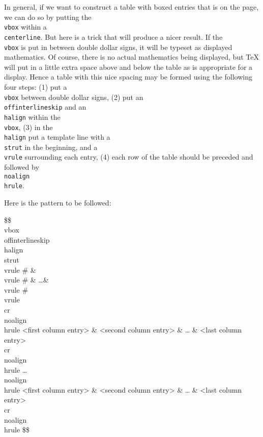 In general, if we want to construct a table with boxed entries 
that is \centred{} on the page, we can do so by putting the {\tt 
\\vbox} within a {\tt \\centerline\lb\rb}\null. But here is a 
trick that will produce a nicer result.  If the {\tt \\vbox} is 
put in between double dollar signs, it will be typeset as 
displayed mathematics.  Of course, there is no actual 
mathematics being displayed, but \TeX{} will put in a little 
extra space above and below the table as is appropriate for a 
display.  Hence a \centred{} table with this nice spacing may be 
formed using the following four steps: 
(1) put a {\tt \\vbox} between double dollar signs, 
(2) put an {\tt \\offinterlineskip} and an {\tt \\halign} within 
the {\tt \\vbox}, 
(3) in the {\tt \\halign} put a template line with a {\tt \\strut} 
in the beginning,  and a {\tt \\vrule} surrounding each entry, 
(4) each row of the table should be preceded and followed by 
{\tt \\noalign\lb\\hrule\rb}. 
 
Here is the pattern to be followed: 
 
\beginuser 
\$\$\\vbox\lb 
\\offinterlineskip 
\\halign\lb 
\\strut \\vrule \# \& \\vrule \# \& \dots \& \\vrule \# \\vrule \\cr 
\\noalign\lb\\hrule\rb 
<first column entry> \& <second column entry> \& \dots %
\& <last column entry> \\cr 
\\noalign\lb\\hrule\rb 
\dots 
\\noalign\lb\\hrule\rb 
<first column entry> \& <second column entry> \& \dots %
\& <last column entry> \\cr 
\\noalign\lb\\hrule\rb 
\rb 
\rb\$\$ 
\enduser 
 
